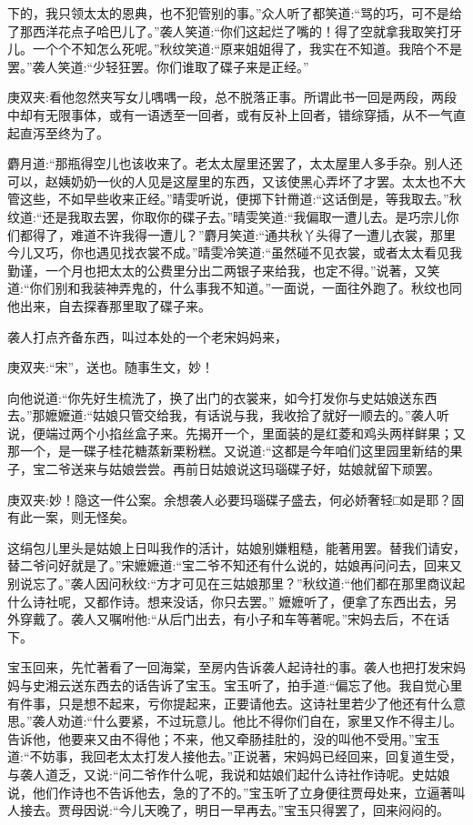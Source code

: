 \begin{parag}
下的，我只领太太的恩典，也不犯管别的事。”众人听了都笑道:“骂的巧，可不是给了那西洋花点子哈巴儿了。”袭人笑道:“你们这起烂了嘴的！得了空就拿我取笑打牙儿。一个个不知怎么死呢。”秋纹笑道:“原来姐姐得了，我实在不知道。我陪个不是罢。”袭人笑道:“少轻狂罢。你们谁取了碟子来是正经。”\begin{note}庚双夹:看他忽然夹写女儿喁喁一段，总不脱落正事。所谓此书一回是两段，两段中却有无限事体，或有一语透至一回者，或有反补上回者，错综穿插，从不一气直起直泻至终为了。\end{note}麝月道:“那瓶得空儿也该收来了。老太太屋里还罢了，太太屋里人多手杂。别人还可以，赵姨奶奶一伙的人见是这屋里的东西，又该使黑心弄坏了才罢。太太也不大管这些，不如早些收来正经。”晴雯听说，便掷下针黹道:“这话倒是，等我取去。”秋纹道:“还是我取去罢，你取你的碟子去。”晴雯笑道:“我偏取一遭儿去。是巧宗儿你们都得了，难道不许我得一遭儿？”麝月笑道:“通共秋丫头得了一遭儿衣裳，那里今儿又巧，你也遇见找衣裳不成。”晴雯冷笑道:“虽然碰不见衣裳，或者太太看见我勤谨，一个月也把太太的公费里分出二两银子来给我，也定不得。”说著，又笑道:“你们别和我装神弄鬼的，什么事我不知道。”一面说，一面往外跑了。秋纹也同他出来，自去探春那里取了碟子来。
\end{parag}


\begin{parag}
    袭人打点齐备东西，叫过本处的一个老宋妈妈来，\begin{note}庚双夹:“宋”，送也。随事生文，妙！\end{note}向他说道:“你先好生梳洗了，换了出门的衣裳来，如今打发你与史姑娘送东西去。”那嬷嬷道:“姑娘只管交给我，有话说与我，我收拾了就好一顺去的。”袭人听说，便端过两个小掐丝盒子来。先揭开一个，里面装的是红菱和鸡头两样鲜果；又那一个，是一碟子桂花糖蒸新栗粉糕。又说道:“这都是今年咱们这里园里新结的果子，宝二爷送来与姑娘尝尝。再前日姑娘说这玛瑙碟子好，姑娘就留下顽罢。\begin{note}庚双夹:妙！隐这一件公案。余想袭人必要玛瑙碟子盛去，何必娇奢轻□如是耶？固有此一案，则无怪矣。\end{note}这绢包儿里头是姑娘上日叫我作的活计，姑娘别嫌粗糙，能著用罢。替我们请安，替二爷问好就是了。”宋嬷嬷道:“宝二爷不知还有什么说的，姑娘再问问去，回来又别说忘了。”袭人因问秋纹:“方才可见在三姑娘那里？”秋纹道:“他们都在那里商议起什么诗社呢，又都作诗。想来没话，你只去罢。” 嬷嬷听了，便拿了东西出去，另外穿戴了。袭人又嘱咐他:“从后门出去，有小子和车等著呢。”宋妈去后，不在话下。
\end{parag}


\begin{parag}
    宝玉回来，先忙著看了一回海棠，至房内告诉袭人起诗社的事。袭人也把打发宋妈妈与史湘云送东西去的话告诉了宝玉。宝玉听了，拍手道:“偏忘了他。我自觉心里有件事，只是想不起来，亏你提起来，正要请他去。这诗社里若少了他还有什么意思。”袭人劝道:“什么要紧，不过玩意儿。他比不得你们自在，家里又作不得主儿。告诉他，他要来又由不得他；不来，他又牵肠挂肚的，没的叫他不受用。”宝玉道:“不妨事，我回老太太打发人接他去。”正说著，宋妈妈已经回来，回复道生受，与袭人道乏，又说:“问二爷作什么呢，我说和姑娘们起什么诗社作诗呢。史姑娘说，他们作诗也不告诉他去，急的了不的。”宝玉听了立身便往贾母处来，立逼著叫人接去。贾母因说:“今儿天晚了，明日一早再去。”宝玉只得罢了，回来闷闷的。
\end{parag}


